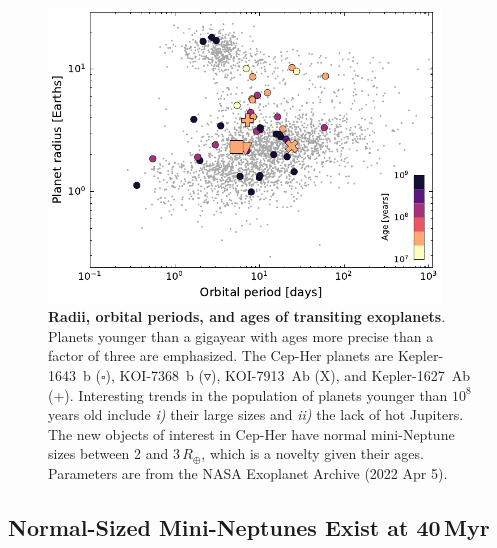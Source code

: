 \documentclass[12pt,twocolumn,tighten,linenumbers,trackchanges]{aastex63}
\begin{document}
\begin{figure}[!t]
	\begin{center}
		\leavevmode
		\includegraphics[width=0.93\textwidth]{f4.pdf}
	\end{center}
	\vspace{-0.6cm}
	\caption{
		{\bf Radii, orbital periods, and ages of transiting exoplanets}.
    Planets younger than a gigayear with ages more precise than a
    factor of three are emphasized. The Cep-Her planets are
    Kepler-1643~b ($\square$), KOI-7368~b ($\triangledown$),
    KOI-7913~Ab (X), and Kepler-1627~Ab (+).  Interesting trends in
    the population of planets younger than $10^8$ years old include {\it i)} their
    large sizes and {\it ii)} the lack of hot Jupiters.  The new
    objects of interest in Cep-Her have normal mini-Neptune sizes
    between 2 and 3\,$R_\oplus$, which is a novelty given their ages.
    Parameters are from the NASA Exoplanet Archive (2022 Apr 5).
		\label{fig:rp_period_age}
	}
\end{figure}


\subsection{Normal-Sized Mini-Neptunes Exist at 40$\,$Myr}
\label{subsec:sizes}
\end{document}
